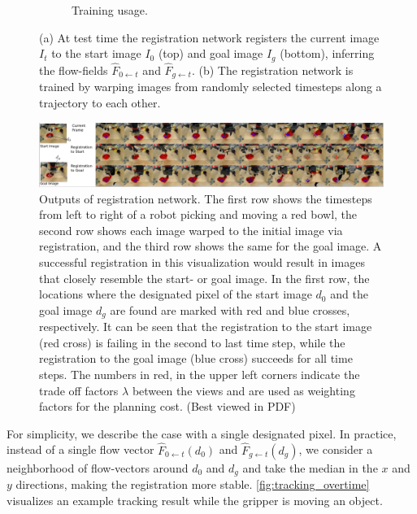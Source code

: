 \begin{figure}[t!]
\begin{subfigure}[b]{0.55\linewidth}
		\caption{\small{Training usage.}}
		\label{fig:discrete}
	\end{subfigure}
	\vspace{-1mm}
	\caption{\small{(a) At test time the registration network registers the current image $I_t$ to the start image $I_0$ (top) and goal image $I_g$ (bottom), inferring the flow-fields $\hat{F}_{0 \leftarrow t}$ and $\hat{F}_{g \leftarrow t}$. (b) The registration network is trained by warping images from randomly selected timesteps along a trajectory to each other.
	}}
	\label{fig:registration_arch}
\end{figure}

\begin{figure}
	\centering
	\vspace{-0.1in}	\includegraphics[width=1\linewidth]{images_rfr/reg_over_time.png}
	\caption{\small{Outputs of registration network. The first row shows the timesteps from left to right of a robot picking and moving a red bowl, the second row shows each image warped to the initial image via registration, and the third row shows the same for the goal image. A successful registration in this visualization would result in images that closely resemble the start- or goal image. In the first row, the locations where the designated pixel of the start image $d_0$ and the goal image $d_g$ are found are marked with red and blue crosses, respectively. It can be seen that the registration to the start image (red cross) is failing in the second to last time step, while the registration to the goal image (blue cross) succeeds for all time steps. The numbers in red, in the upper left corners indicate the trade off factors $\lambda$ between the views and are used as weighting factors for the planning cost. (Best viewed in PDF)}}
	\label{fig:tracking_overtime}
	\vspace{-0.2in}
\end{figure}

For simplicity, we describe the case with a single designated pixel. In practice, instead of a single flow vector $\hat{F}_{0 \leftarrow t}(d_0)$ and $\hat{F}_{g \leftarrow t}(d_g)$, we consider a neighborhood of flow-vectors around $d_0$ and $d_g$ and take the median in the $x$ and $y$ directions, making the registration more stable.
\autoref{fig:tracking_overtime} visualizes an example tracking result while the gripper is moving an object.

